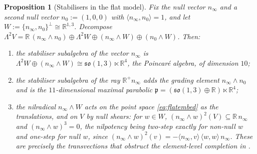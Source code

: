 \documentclass[11pt]{article}
\newtheorem{proposition}[theorem]{Proposition}
\theoremstyle{definition}
\newcommand{\R}{\mathbb{R}}
\newcommand{\nO}{n_0}
\newcommand{\nInf}{n_\infty}
\newcommand{\ip}[2]{\langle #1, #2\rangle}
\begin{document}
\begin{proposition}[Stabilisers in the flat model]\label{prop:flatstab}
Fix the null vector $\nInf$ and a second null vector $\nO := (1,0,0)$ with $\ip{\nInf}{\nO} = 1$, and let $W := \{\nInf, \nO\}^\perp \cong \R^{1,3}$. Decompose $\Lambda^2 V = \R\,(\nInf \wedge \nO) \oplus \Lambda^2 W \oplus (\nInf \wedge W) \oplus (\nO \wedge W)$. Then:
\begin{enumerate}
\item the stabiliser subalgebra of the vector $\nInf$ is $\Lambda^2 W \oplus (\nInf \wedge W) \cong \mathfrak{so}(1,3) \ltimes \R^4$, the Poincar\'e algebra, of dimension $10$;
\item the stabiliser subalgebra of the ray $\R^+\nInf$ adds the grading element $\nInf \wedge \nO$ and is the $11$-dimensional maximal parabolic $\mathfrak{p} = (\mathfrak{so}(1,3) \oplus \R) \ltimes \R^4$;
\item the nilradical $\nInf \wedge W$ acts on the point space \eqref{eq:flatembed} as the translations, and on $V$ by null shears: for $w \in W$, $(\nInf \wedge w)^2(V) \subseteq \R\,\nInf$ and $(\nInf \wedge w)^3 = 0$, the nilpotency being two-step exactly for non-null $w$ and one-step for null $w$, since $(\nInf \wedge w)^2(v) = -\ip{\nInf}{v}\,\ip{w}{w}\,\nInf$. These are precisely the transvections that obstruct the element-level completion in \cite[Thm.~4.2]{ButlerT1}.
\end{enumerate}
\end{proposition}
\end{document}
